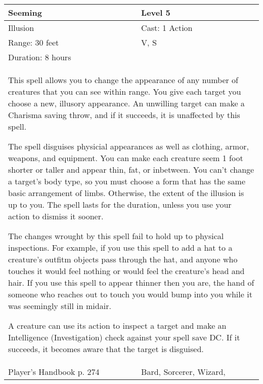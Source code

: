 \documentclass[11pt]{report}
\begin{document}
\begin{table}[H]
	\begin{tabular}{||p{6cm}|p{6cm}||}
		\hline\hline
		\bf{Seeming} & Level 5\\ \hline
		Illusion & Cast: 1 Action\\ \hline
		Range: 30 feet & V, S\\ \hline
		Duration: 8 hours & \\ \hline
		\multicolumn{2}{||p{12cm}||}{This spell allows you to change the appearance of any number of creatures that you can see within range.
You give each target you choose a new, illusory appearance. An unwilling target can make a Charisma saving throw, and if it succeeds, it is unaffected by this spell.

The spell disguises physicial appearances as well as clothing, armor, weapons, and equipment. You can make each creature seem 1 foot shorter or taller and appear thin, fat, or inbetween. You can’t change a target’s body type, so you must choose a form that has the same basic arrangement of limbs. Otherwise, the extent of the illusion is up to you. The spell lasts for the duration, unless you use your action to dismiss it sooner.

The changes wrought by this spell fail to hold up to physical inspections. For example, if you use this spell to add a hat to a creature’s outfitm objects pass through the hat, and anyone who touches it would feel nothing or would feel the creature’s head and hair. If you use this spell to appear thinner then you are, the hand of someone who reaches out to touch you would bump into you while it was seemingly still in midair.

A creature can use its action to inspect a target and make an Intelligence (Investigation) check against your spell save DC. If it succeeds, it becomes aware that the target is disguised.}\\ \hline
Player's Handbook p. 274 & Bard, Sorcerer, Wizard, \\ \hline\hline
	\end{tabular}
\end{table}
\end{document}
